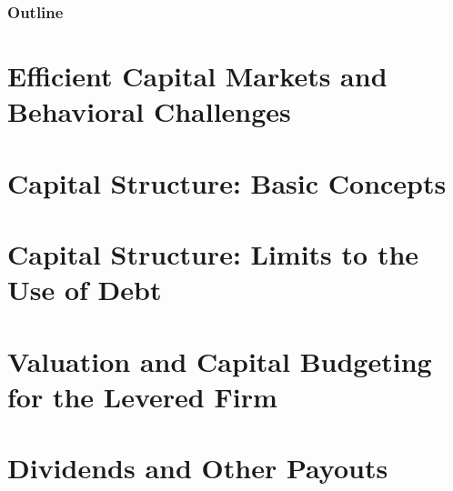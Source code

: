 \documentclass[xcolor=table]{beamer}
\begin{document}
\begin{frame}
\frametitle{Outline} %

\tableofcontents[hideallsubsections] %

\end{frame}

\section[EMH]{Efficient Capital Markets and Behavioral Challenges}


\section[CS: Basic]{Capital Structure: Basic Concepts}


\section{Capital Structure: Limits to the Use of Debt}


\section{Valuation and Capital Budgeting for the Levered Firm}


\section{Dividends and Other Payouts}

\end{document}
